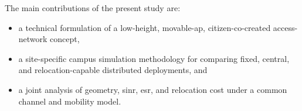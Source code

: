 The main contributions of the present study are:
\begin{itemize}
    \item a technical formulation of a low-height, movable-\gls{ap}, citizen-co-created access-network concept,
    \item a site-specific campus simulation methodology for comparing fixed, central, and relocation-capable distributed deployments, and
    \item a joint analysis of geometry, \gls{sinr}, \gls{esr}, and relocation cost under a common channel and mobility model.
\end{itemize}
